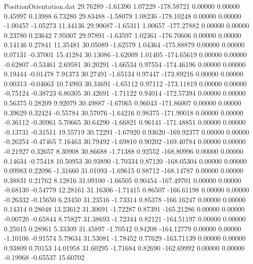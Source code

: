 \begin{filecontents}{PositionOrientation.dat}
  29.76289   -1.61390    1.07229  -178.58721    0.00000    0.00000    0.45997    0.13988    6.73280
  29.83488   -1.58079    1.08236  -178.10248    0.00000    0.00000   -1.00457   -1.05273   11.44136
  29.90687   -1.65311    1.00657  -177.27882    0.00000    0.00000    0.23780    0.23642    7.95007
  29.97891   -1.63597    1.02361  -176.70606    0.00000    0.00000    0.14146    0.27841   11.35481
  30.05089   -1.62579    1.04364  -175.88879    0.00000    0.00000    0.07131   -0.37001   15.41284
  30.13086   -1.62009    1.01405  -174.65619    0.00000    0.00000   -0.62807   -0.53461    2.69581
  30.20291   -1.66534    0.97554  -174.46196    0.00000    0.00000    0.19444   -0.01478    7.91373
  30.27491   -1.65134    0.97447  -173.89216    0.00000    0.00000    0.00313   -0.04663   10.74993
  30.34691   -1.65112    0.97112  -173.11819    0.00000    0.00000   -0.75124   -0.38723    6.80305
  30.42691   -1.71122    0.94014  -172.57394    0.00000    0.00000    0.56375    0.28209    9.92079
  30.49887   -1.67065    0.96043  -171.86007    0.00000    0.00000    0.39629    0.32424   -0.55784
  30.57076   -1.64216    0.98375  -171.90018    0.00000    0.00000   -0.36112   -0.30961    5.70665
  30.64290   -1.66821    0.96141  -171.48851    0.00000    0.00000   -0.13731   -0.31511   19.55719
  30.72291   -1.67920    0.93620  -169.92377    0.00000    0.00000   -0.26254   -0.47465    7.16463
  30.79492   -1.69810    0.90202  -169.40784    0.00000    0.00000   -0.21927    0.32657    8.30908
  30.86688   -1.71388    0.92552  -168.80996    0.00000    0.00000    0.14634   -0.75418   10.50953
  30.93890   -1.70334    0.87120  -168.05304    0.00000    0.00000    0.09983    0.22096   -1.31660
  31.01093   -1.69615    0.88712  -168.14787    0.00000    0.00000    0.38831    0.21762    8.12816
  31.09100   -1.66505    0.90454  -167.49701    0.00000    0.00000   -0.68130   -0.54779   12.28161
  31.16306   -1.71415    0.86507  -166.61198    0.00000    0.00000   -0.26332   -0.15650    6.23450
  31.23516   -1.73314    0.85378  -166.16247    0.00000    0.00000    0.14314    0.28048   13.23612
  31.30691   -1.72287    0.87391  -165.21286    0.00000    0.00000   -0.00720   -0.65844    8.75827
  31.38693   -1.72344    0.82121  -164.51197    0.00000    0.00000    0.25015    0.28961    5.33309
  31.45897   -1.70542    0.84208  -164.12779    0.00000    0.00000   -1.10106   -0.91574    5.79634
  31.53081   -1.78452    0.77629  -163.71139    0.00000    0.00000    0.93809    0.70153   14.01958
  31.60295   -1.71684    0.82690  -162.69992    0.00000    0.00000   -0.19968   -0.65537   15.60702

\end{filecontents}
